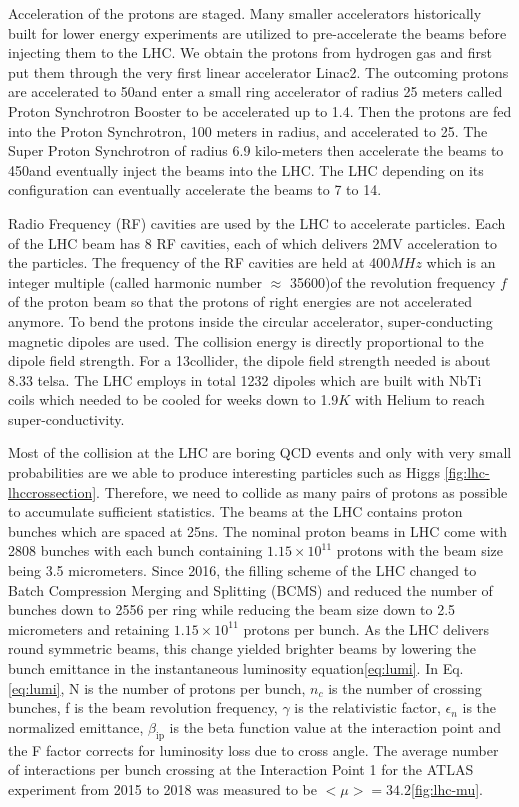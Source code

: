 Acceleration of the protons are staged. Many smaller accelerators historically built for lower energy experiments are utilized to pre-accelerate the beams before injecting them to the LHC. We obtain the protons from hydrogen gas and first put them through the very first linear accelerator Linac2. The outcoming protons are accelerated to 50\mev and enter a small ring accelerator of radius 25 meters called Proton Synchrotron Booster to be accelerated up to 1.4\gev. Then the protons are fed into the Proton Synchrotron, 100 meters in radius, and accelerated to 25\gev. The Super Proton Synchrotron of radius 6.9 kilo-meters then accelerate the beams to 450\gev and eventually inject the beams into the LHC. The LHC depending on its configuration can eventually accelerate the beams to 7 to 14\tev.

Radio Frequency (RF) cavities are used by the LHC to accelerate particles. Each of the LHC beam has 8 RF cavities, each of which delivers 2MV acceleration to the particles. The frequency of the RF cavities are held at 400$MHz$ which is an integer multiple (called harmonic number $\approx$ 35600)of the revolution frequency $f$ of the proton beam so that the protons of right energies are not accelerated anymore. To bend the protons inside the circular accelerator, super-conducting magnetic dipoles are used. The collision energy is directly proportional to the dipole field strength. For a 13\tev collider, the dipole field strength needed is about 8.33 telsa. The LHC employs in total 1232 dipoles which are built with NbTi coils which needed to be cooled for weeks down to 1.9$K$ with Helium to reach super-conductivity.

Most of the collision at the LHC are boring QCD events and only with very small probabilities are we able to produce interesting particles such as Higgs \ref{fig:lhc-lhccrossection}. Therefore, we need to collide as many pairs of protons as possible to accumulate sufficient statistics. The beams at the LHC contains proton bunches which are spaced at 25ns. The nominal proton beams in LHC come with 2808 bunches with each bunch containing $1.15\times 10^{11}$ protons with the beam size being 3.5 micrometers. Since 2016, the filling scheme of the LHC changed to Batch Compression Merging and Splitting (BCMS) and reduced the number of bunches down to 2556 per ring while reducing the beam size down to 2.5 micrometers and retaining $1.15\times 10^{11}$ protons per bunch. As the LHC delivers round symmetric beams, this change yielded brighter beams by lowering the bunch emittance in the instantaneous luminosity equation\ref{eq:lumi}. In Eq.\ref{eq:lumi}, N is the number of protons per bunch, $n_c$ is the number of crossing bunches, f is the beam revolution frequency, $\gamma$ is the relativistic factor, $\epsilon_n$ is the normalized emittance, $\beta_{\text{ip}}$ is the beta function value at the interaction point and the F factor corrects for luminosity loss due to cross angle. The average number of interactions per bunch crossing at the Interaction Point 1 for the ATLAS experiment from 2015 to 2018 was measured to be $<\mu>=34.2$\ref{fig:lhc-mu}. 


